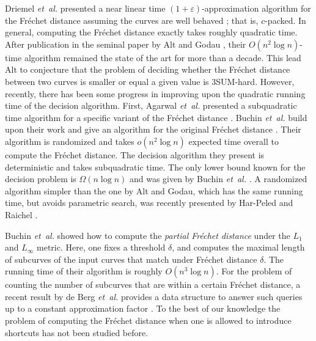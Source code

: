 \documentclass[12pt]{article}
\providecommand{\si}[1]{#1}
\newcommand{\etal}{\textit{et~al.}\xspace}
\newcommand{\Frechet}{Fr\'{e}c{h}e{}t\xspace}\providecommand{\Arr}{\mathop{\mathrm{\EuScript{A}}}}
\providecommand{\pth}[2][\!]{#1\left({#2}\right)}
\providecommand{\eps}{{\varepsilon}}\renewcommand{\Re}{{\rm I\!\hspace{-0.025em} R}}
\numberwithin{figure}{section}
\numberwithin{equation}{section}
\begin{document}
Driemel \etal presented a near linear time $(1+\eps)$-approximation
algorithm for the \Frechet distance assuming the curves are well
behaved \cite{dhw-afdrc-12}; that is, $c$-packed.  In general,
computing the \Frechet distance exactly takes roughly quadratic time.
After publication in the seminal paper by Alt and Godau
\cite{ag-cfdbt-95}, their $O(n^2 \log n)$-time algorithm remained the
state of the art for more than a decade.  This lead Alt to conjecture
that the problem of deciding whether the \Frechet distance between two
curves is smaller or equal a given value is 3SUM-hard.  However,
recently, there has been some progress in improving upon the quadratic
running time of the decision algorithm.  First, Agarwal \etal
presented a subquadratic time algorithm for a specific variant of the
\Frechet distance \cite{aaks-dfst-13}.  Buchin \etal build upon their
work and give an algorithm for the original \Frechet distance
\cite{bbmm-fswd-12}.  Their algorithm is randomized and takes $o\pth{
   n^2 \log n}$ expected time overall to compute the \Frechet
distance. The decision algorithm they present is deterministic and
takes subquadratic time.  The only lower bound known for the decision
problem is $\Omega(n \log n)$ and was given by Buchin \etal
\cite{bbkrw-wtd-07}.  A randomized algorithm simpler than the one by
Alt and Godau, which has the same running time, but avoids parametric
search, was recently presented by Har-Peled and Raichel
\cite{hr-fdre-13}.

Buchin \etal \cite{bbw-eapcm-09} showed how to compute the
\emph{partial \Frechet distance} under the $L_1$ and $L_\infty$
metric.  Here, one fixes a threshold $\delta$, and computes the
maximal length of subcurves of the input curves that match under
\Frechet distance $\delta$.  The running time of their algorithm is
roughly $O\pth{n^3 \log n}$.  For the problem of counting the number
of subcurves that are within a certain \Frechet distance, a recent
result by \si{de Berg} \etal provides a data structure to answer such
queries up to a constant approximation factor \cite{bcg-ffq-11}.  To
the best of our knowledge the problem of computing the \Frechet
distance when one is allowed to introduce shortcuts has not been
studied before.
\end{document}
